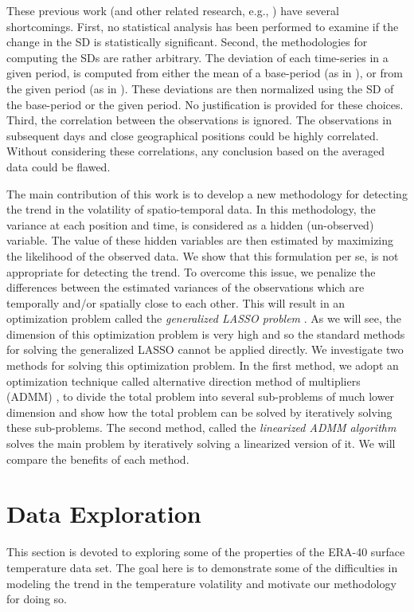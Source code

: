 \documentclass{article}
\begin{document}
These previous work (and other related research, e.g., \citep{rhines_frequent_2013}) have several shortcomings. First, no statistical analysis has been performed to examine if the change in the SD is statistically significant. Second, the methodologies for computing the SDs are rather arbitrary. The deviation of each time-series in a given period, is computed from either the mean of a base-period (as in \citep{hansen_perception_2012}), or from the given period (as in \citep{rhines_frequent_2013,huntingford_no_2013}). These deviations are then normalized using the SD of the base-period or the given period. No justification is provided for these choices. Third, the correlation between the observations is ignored. The observations in subsequent days and close geographical positions could be highly correlated. Without considering these correlations, any conclusion based on the averaged data could be flawed.

The main contribution of this work is to develop a new methodology for detecting the trend in the volatility of spatio-temporal data. In this methodology, the variance at each position and time, is considered as a hidden (un-observed) variable. The value of these hidden variables are then estimated by maximizing the likelihood of the observed data. We show that this formulation per se, is not appropriate for detecting the trend. To overcome this issue, we penalize the differences between the estimated variances of the observations which are temporally and/or spatially close to each other. This will result in an optimization problem called the \textit{generalized LASSO problem} \citep{tibshirani_solution_2011}. As we will see, the dimension of this optimization problem is very high and so the standard methods for solving the generalized LASSO cannot be applied directly. We investigate two methods for solving this optimization problem. In the first method, we adopt an optimization technique called alternative direction method of multipliers (ADMM) \citep{boyd_distributed_2011}, to divide the total problem into several sub-problems of much lower dimension and show how the total problem can be solved by iteratively solving these sub-problems. The second method, called the \textit{linearized ADMM algorithm} \citep{parikh_proximal_2014} solves the main problem by iteratively solving a linearized version of it. We will compare the benefits of each method.


\section{Data Exploration}
This section is devoted to exploring some of the properties of the ERA-40 surface temperature data set. The goal here is to demonstrate some of the difficulties in modeling the trend in the temperature volatility and motivate our methodology for doing so.
\end{document}
